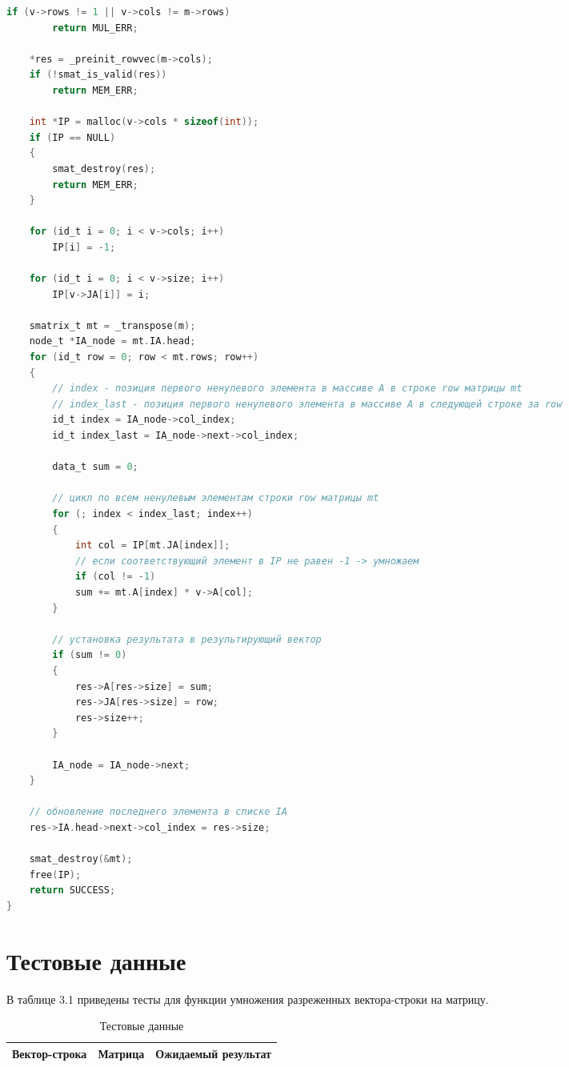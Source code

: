 \begin{lstlisting}[label=mult,language=C,caption=Реализация умножения матриц]
	if (v->rows != 1 || v->cols != m->rows)
		return MUL_ERR;
	
	*res = _preinit_rowvec(m->cols);
	if (!smat_is_valid(res))
		return MEM_ERR;
	
	int *IP = malloc(v->cols * sizeof(int));
	if (IP == NULL)
	{
		smat_destroy(res);
		return MEM_ERR;
	}
	
	for (id_t i = 0; i < v->cols; i++)
		IP[i] = -1;
	
	for (id_t i = 0; i < v->size; i++)
		IP[v->JA[i]] = i;
	
	smatrix_t mt = _transpose(m);
	node_t *IA_node = mt.IA.head;
	for (id_t row = 0; row < mt.rows; row++)
	{
		// index - позиция первого ненулевого элемента в массиве A в строке row матрицы mt
		// index_last - позиция первого ненулевого элемента в массиве А в следующей строке за row
		id_t index = IA_node->col_index;
		id_t index_last = IA_node->next->col_index;
		
		data_t sum = 0;
		
		// цикл по всем ненулевым элементам строки row матрицы mt
		for (; index < index_last; index++)
		{
			int col = IP[mt.JA[index]];
			// если соответствующий элемент в IP не равен -1 -> умножаем
			if (col != -1)
			sum += mt.A[index] * v->A[col];
		}
		
		// установка результата в результирующий вектор
		if (sum != 0)
		{
			res->A[res->size] = sum;
			res->JA[res->size] = row;
			res->size++;
		}
		
		IA_node = IA_node->next;
	}
	
	// обновление последнего элемента в списке IA
	res->IA.head->next->col_index = res->size;
	
	smat_destroy(&mt);
	free(IP);
	return SUCCESS;
}

\end{lstlisting}

\section{Тестовые данные}

В таблице 3.1 приведены тесты для функции умножения разреженных вектора-строки на матрицу.

\begin{table}
	\begin{center}
		\begin{tabular}{|c|c|c|}
			\hline
			Вектор-строка & Матрица & Ожидаемый результат \\
			\hline
		\end{tabular}
	\end{center}
	\caption{Тестовые данные}
\end{table}


